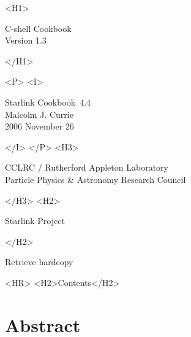 \documentclass[twoside,11pt]{article}
\newcommand{\stardoccategory}  {Starlink Cookbook}
\newcommand{\stardocsource}    {sc4.4}
\newcommand{\stardocnumber}    {4.4}
\newcommand{\stardocauthors}   {Malcolm J. Currie}
\newcommand{\stardocdate}      {2006 November 26}
\newcommand{\stardoctitle}     {C-shell Cookbook}
\newcommand{\stardocversion}   {Version 1.3}
\newcommand{\stardocmanual}    {}
\newcommand{\htmladdnormallink}[2]{#1}
\newcommand{\htmladdimg}[1]{}
\newcommand{\htmlref}[2]{#1}
\newcommand{\htmladdtonavigation}[1]{}
\newcommand{\xlabel}[1]{}
\begin{document}
\begin{htmlonly}
   \xlabel{}
   \begin{rawhtml} <H1> \end{rawhtml}
      \stardoctitle\\
      \stardocversion\\
      \stardocmanual
   \begin{rawhtml} </H1> \end{rawhtml}


   \begin{rawhtml} <P> <I> \end{rawhtml}
   \stardoccategory\ \stardocnumber \\
   \stardocauthors \\
   \stardocdate
   \begin{rawhtml} </I> </P> <H3> \end{rawhtml}
      \htmladdnormallink{CCLRC}{http://www.cclrc.ac.uk} /
      \htmladdnormallink{Rutherford Appleton Laboratory}
                        {http://www.cclrc.ac.uk/ral} \\
      \htmladdnormallink{Particle Physics \& Astronomy Research Council}
                        {http://www.pparc.ac.uk} \\
   \begin{rawhtml} </H3> <H2> \end{rawhtml}
      \htmladdnormallink{Starlink Project}{http://www.starlink.ac.uk/}
   \begin{rawhtml} </H2> \end{rawhtml}
   \htmladdnormallink{\htmladdimg{source.gif} Retrieve hardcopy}
      {http://www.starlink.ac.uk/cgi-bin/hcserver?\stardocsource}\\

  \label{stardoccontents}
  \begin{rawhtml} 
    <HR>
    <H2>Contents</H2>
  \end{rawhtml}
  \htmladdtonavigation{\htmlref{\htmladdimg{contents_motif.gif}}
        {stardoccontents}}

  \section{\xlabel{abstract}Abstract}
\end{htmlonly}
\end{document}
